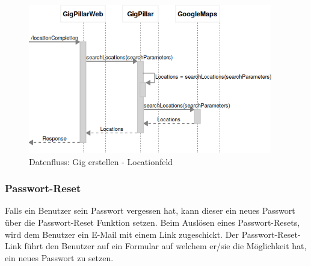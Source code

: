 %

\begin{figure}[!htb]
  \centering
  \includegraphics[width=0.95\textwidth]{konzept/datenfluss-locationfeld.png}
  \caption{Datenfluss: Gig erstellen - Locationfeld}
\end{figure}





\clearpage
\subsubsection{Passwort-Reset}\label{datenfluss-passwort-reset}

Falls ein Benutzer sein Passwort vergessen hat, kann dieser ein neues Passwort
über die Passwort-Reset Funktion setzen. Beim Auslösen eines Passwort-Resets,
wird dem Benutzer ein E-Mail mit einem Link zugeschickt.
Der Passwort-Reset-Link führt den Benutzer auf ein Formular auf welchem er/sie
die Möglichkeit hat, ein neues Passwort zu setzen.

